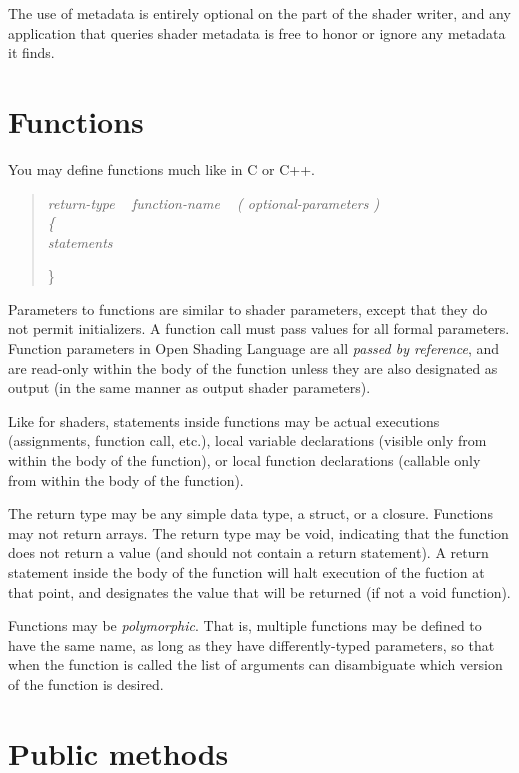 \documentclass[11pt,letterpaper]{book}
\def\langname{Open Shading Language\xspace}
\begin{document}
\apiend

The use of metadata is entirely optional on the part of the shader
writer, and any application that queries shader metadata is free to
honor or ignore any metadata it finds.


\newpage
\section{Functions}
\label{sec:functions}

You may define functions much like in C or C++.

\begin{quote}
\em
return-type ~ function-name ~ {\rm\cf (} optional-parameters {\rm\cf )} \\
\rm
{\cf \{ } \\
\em
\spc statements

{\cf \} }
\end{quote}

Parameters to functions are similar to shader parameters, except that
they do not permit initializers.  A function call must pass values for
all formal parameters.  Function parameters in \langname are all
\emph{passed by reference}, and are read-only within the body of the
function unless they are also designated as {\cf output} (in the same
manner as output shader parameters).

Like for shaders, statements inside functions may be actual executions
(assignments, function call, etc.), local variable declarations (visible
only from within the body of the function), or local function
declarations (callable only from within the body of the function).

The return type may be any simple data type, a {\cf struct}, or a {\cf
  closure}.  Functions may not return arrays.  The return type may be
{\cf void}, indicating that the function does not return a value (and
should not contain a {\cf return} statement).  A {\cf return} statement
inside the body of the function will halt execution of the fuction at
that point, and designates the value that will be returned (if not a
{\cf void} function).

Functions may be \emph{polymorphic}.  That is, multiple functions may be
defined to have the same name, as long as they have differently-typed
parameters, so that when the function is called the list of arguments
can disambiguate which version of the function is desired.

\section{Public methods}
\label{sec:publicmethods}
\end{document}
